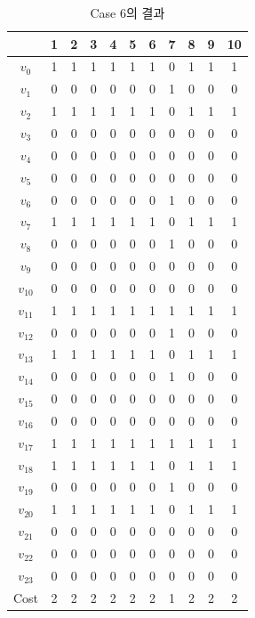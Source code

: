 \documentclass[12pt,a4paper]{article}
\begin{document}
    \begin{table}[htb!]
    \centering
    \begin{tabular}{c c c c c c c c c c c}
        & 1 & 2 & 3 & 4 & 5 & 6 & 7 & 8 & 9 & 10 \\
        \hline
        $v_0$ & 1 & 1 & 1 & 1 & 1 & 1 & 0 & 1 & 1 & 1 \\
        $v_1$ & 0 & 0 & 0 & 0 & 0 & 0 & 1 & 0 & 0 & 0 \\
        $v_2$ & 1 & 1 & 1 & 1 & 1 & 1 & 0 & 1 & 1 & 1 \\
        $v_3$ & 0 & 0 & 0 & 0 & 0 & 0 & 0 & 0 & 0 & 0 \\
        $v_4$ & 0 & 0 & 0 & 0 & 0 & 0 & 0 & 0 & 0 & 0 \\
        $v_5$ & 0 & 0 & 0 & 0 & 0 & 0 & 0 & 0 & 0 & 0 \\
        $v_6$ & 0 & 0 & 0 & 0 & 0 & 0 & 1 & 0 & 0 & 0 \\
        $v_7$ & 1 & 1 & 1 & 1 & 1 & 1 & 0 & 1 & 1 & 1 \\
        $v_8$ & 0 & 0 & 0 & 0 & 0 & 0 & 1 & 0 & 0 & 0 \\
        $v_9$ & 0 & 0 & 0 & 0 & 0 & 0 & 0 & 0 & 0 & 0 \\
        $v_{10}$ & 0 & 0 & 0 & 0 & 0 & 0 & 0 & 0 & 0 & 0 \\
        $v_{11}$ & 1 & 1 & 1 & 1 & 1 & 1 & 1 & 1 & 1 & 1 \\
        $v_{12}$ & 0 & 0 & 0 & 0 & 0 & 0 & 1 & 0 & 0 & 0 \\
        $v_{13}$ & 1 & 1 & 1 & 1 & 1 & 1 & 0 & 1 & 1 & 1 \\
        $v_{14}$ & 0 & 0 & 0 & 0 & 0 & 0 & 1 & 0 & 0 & 0 \\
        $v_{15}$ & 0 & 0 & 0 & 0 & 0 & 0 & 0 & 0 & 0 & 0 \\
        $v_{16}$ & 0 & 0 & 0 & 0 & 0 & 0 & 0 & 0 & 0 & 0 \\
        $v_{17}$ & 1 & 1 & 1 & 1 & 1 & 1 & 1 & 1 & 1 & 1 \\
        $v_{18}$ & 1 & 1 & 1 & 1 & 1 & 1 & 0 & 1 & 1 & 1 \\
        $v_{19}$ & 0 & 0 & 0 & 0 & 0 & 0 & 1 & 0 & 0 & 0 \\
        $v_{20}$ & 1 & 1 & 1 & 1 & 1 & 1 & 0 & 1 & 1 & 1 \\
        $v_{21}$ & 0 & 0 & 0 & 0 & 0 & 0 & 0 & 0 & 0 & 0 \\
        $v_{22}$ & 0 & 0 & 0 & 0 & 0 & 0 & 0 & 0 & 0 & 0 \\
        $v_{23}$ & 0 & 0 & 0 & 0 & 0 & 0 & 0 & 0 & 0 & 0 \\
        Cost & 2 & 2 & 2 & 2 & 2 & 2 & 1 & 2 & 2 & 2 \\
    \end{tabular}
    \caption{Case 6의 결과}
    \label{tab:result6}
    \end{table}
\end{document}
